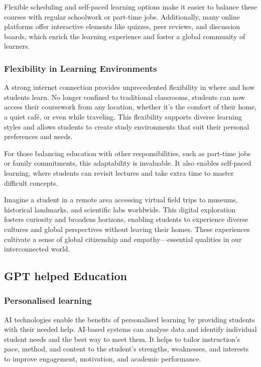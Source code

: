 \documentclass[a4paper,11pt]{article}
\begin{document}
Flexible scheduling and self-paced learning options make it easier to balance these courses with regular schoolwork or part-time jobs. Additionally, many online platforms offer interactive elements like quizzes, peer reviews, and discussion boards, which enrich the learning experience and foster a global community of learners.

\subsubsection{Flexibility in Learning Environments}
A strong internet connection provides unprecedented flexibility in where and how students learn. No longer confined to traditional classrooms, students can now access their coursework from any location, whether it’s the comfort of their home, a quiet café, or even while traveling. This flexibility supports diverse learning styles and allows students to create study environments that suit their personal preferences and needs.

For those balancing education with other responsibilities, such as part-time jobs or family commitments, this adaptability is invaluable. It also enables self-paced learning, where students can revisit lectures and take extra time to master difficult concepts.


Imagine a student in a remote area accessing virtual field trips to museums, historical landmarks, and scientific labs worldwide. This digital exploration fosters curiosity and broadens horizons, enabling students to experience diverse cultures and global perspectives without leaving their homes. These experiences cultivate a sense of global citizenship and empathy—essential qualities in our interconnected world.



\subsection{GPT helped Education}


\subsubsection{Personalised learning}
AI technologies enable the benefits of personalised learning by providing students with their needed help. AI-based systems can analyse data and identify individual student needs and the best way to meet them. It helps to tailor instruction's pace, method, and content to the student's strengths, weaknesses, and interests to improve engagement, motivation, and academic performance.
\end{document}

